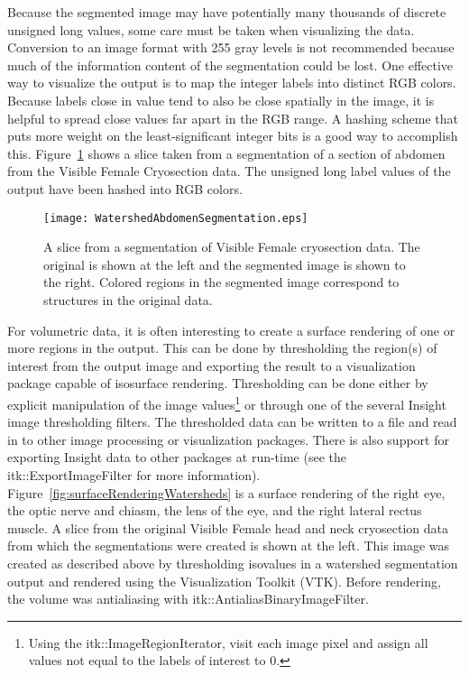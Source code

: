 Because the segmented image may have potentially many thousands of discrete
unsigned long values, some care must be taken when visualizing the
data. Conversion to an image format with 255 gray levels is not recommended
because much of the information content of the segmentation could be lost.  One
effective way to visualize the output is to map the integer labels into
distinct RGB colors.  Because labels close in value tend to also be close
spatially in the image, it is helpful to spread close values far apart in
the RGB range.  A hashing scheme that puts more weight on the least-significant
integer bits is a good way to accomplish this.  Figure~\ref{fig:colorVisWatersheds} 
shows a slice taken from a segmentation of a section of abdomen from the Visible Female
Cryosection data.  The unsigned long label values of the output have been
hashed into RGB colors.

\begin{figure}
\centering
\texttt{[image: WatershedAbdomenSegmentation.eps]}
\caption{A slice from a segmentation of Visible Female cryosection data.
The original is shown at the left and the segmented image is shown to the
right. Colored regions in the segmented image correspond to structures in the
original data. }
\protect\label{fig:colorVisWatersheds}
\end{figure}

For volumetric data, it is often interesting to create a surface rendering of
one or more regions in the output.  This can be done by thresholding the
region(s) of interest from the output image and exporting the result to a
visualization package capable of isosurface rendering.  Thresholding can be
done either by explicit manipulation of the image values\footnote{Using the
itk::ImageRegionIterator, visit each image pixel and assign all values not
equal to the labels of interest to 0.} or through one of the several Insight
image thresholding filters.  The thresholded data can be written to a file and
read in to other image processing or visualization packages.  There is also
support for exporting Insight data to other packages at run-time (see the
itk::ExportImageFilter for more information).
Figure~\ref{fig:surfaceRenderingWatersheds} is a surface rendering of the right
eye, the optic nerve and chiasm, the lens of the eye, and the right lateral
rectus muscle.  A slice from the original Visible Female head and neck
cryosection data from which the segmentations were created is shown at the
left.  This image was created as described above by thresholding isovalues in a
watershed segmentation output and rendered using the Visualization Toolkit
(VTK).  Before rendering, the volume was antialiasing with
itk::AntialiasBinaryImageFilter.

